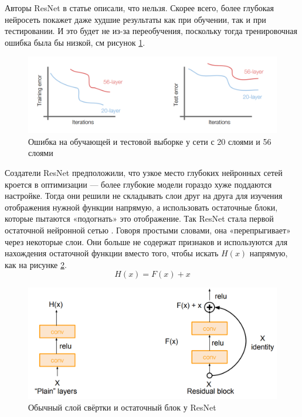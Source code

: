 Авторы ResNet в статье описали, что нельзя. Скорее всего, более глубокая нейросеть покажет даже худшие результаты как при обучении, так и при тестировании. И это будет не из-за переобучения, поскольку тогда тренировочная ошибка была бы низкой, см рисунок \ref{fig:train_error_deep_net}.
\begin{figure} [ht]
    \centering
    \includegraphics[width=\textwidth*2/3]{images/train_error_deep_net.png}
    \caption{Ошибка на обучающей и тестовой выборке у сети с 20 слоями и 56 слоями}
    \label{fig:train_error_deep_net}
\end{figure}

Создатели ResNet предположили, что узкое место глубоких нейронных сетей кроется в оптимизации — более глубокие модели гораздо хуже поддаются настройке. Тогда они решили не складывать слои друг на друга для изучения отображения нужной функции напрямую, а использовать остаточные блоки, которые пытаются «подогнать» это отображение. Так ResNet стала первой остаточной нейронной сетью \cite{resnet}. Говоря простыми словами, она «перепрыгивает» через некоторые слои. Они больше не содержат признаков и используются для нахождения остаточной функции вместо того, чтобы искать $H(x)$ напрямую, как на рисунке \ref{fig:res_block}.
\begin{equation}
    H(x) = F(x) + x
\end{equation}

\begin{figure}
    \centering
    \includegraphics[width=\textwidth*2/3]{images/res_block.png}
    \caption{Обычный слой свёртки и остаточный блок у ResNet}
    \label{fig:res_block}
\end{figure}


